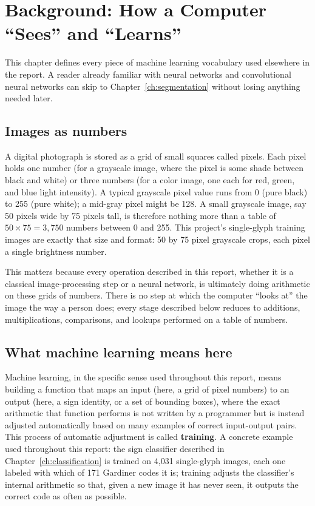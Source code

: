 \documentclass[11pt,a4paper]{report}
\begin{document}
\chapter{Background: How a Computer ``Sees'' and ``Learns''}
\label{ch:background}

This chapter defines every piece of machine learning vocabulary used
elsewhere in the report. A reader already familiar with neural networks and
convolutional neural networks can skip to Chapter~\ref{ch:segmentation}
without losing anything needed later.

\section{Images as numbers}
\label{sec:images-as-numbers}

A digital photograph is stored as a grid of small squares called pixels.
Each pixel holds one number (for a grayscale image, where the pixel is some
shade between black and white) or three numbers (for a color image, one each
for red, green, and blue light intensity). A typical grayscale pixel value
runs from 0 (pure black) to 255 (pure white); a mid-gray pixel might be 128.
A small grayscale image, say 50 pixels wide by 75 pixels tall, is therefore
nothing more than a table of $50 \times 75 = 3{,}750$ numbers between 0 and
255. This project's single-glyph training images are exactly that size and
format: 50 by 75 pixel grayscale crops, each pixel a single brightness
number.

This matters because every operation described in this report, whether it is
a classical image-processing step or a neural network, is ultimately doing
arithmetic on these grids of numbers. There is no step at which the computer
``looks at'' the image the way a person does; every stage described below
reduces to additions, multiplications, comparisons, and lookups performed on
a table of numbers.

\section{What machine learning means here}
\label{sec:what-is-ml}

Machine learning, in the specific sense used throughout this report, means
building a function that maps an input (here, a grid of pixel numbers) to an
output (here, a sign identity, or a set of bounding boxes), where the exact
arithmetic that function performs is not written by a programmer but is
instead adjusted automatically based on many examples of correct
input-output pairs. This process of automatic adjustment is called
\textbf{training}. A concrete example used throughout this report: the sign
classifier described in Chapter~\ref{ch:classification} is trained on 4{,}031
single-glyph images, each one labeled with which of 171 Gardiner codes it
is; training adjusts the classifier's internal arithmetic so that, given a
new image it has never seen, it outputs the correct code as often as
possible.
\end{document}
